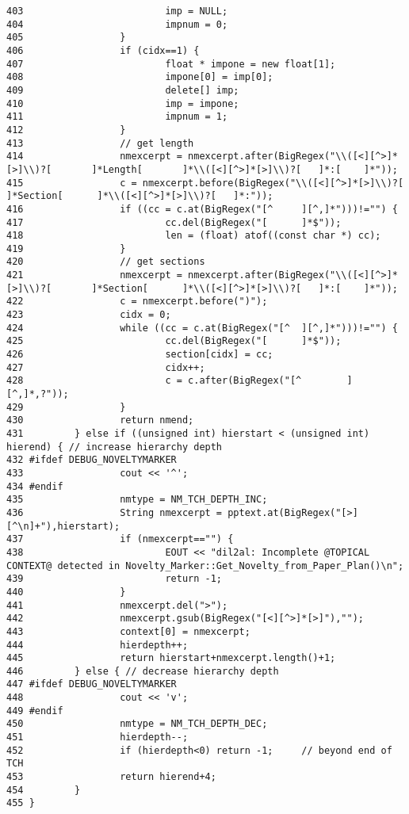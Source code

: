 \begin{verbatim}
403                         imp = NULL;
404                         impnum = 0;
405                 }
406                 if (cidx==1) {
407                         float * impone = new float[1];
408                         impone[0] = imp[0];
409                         delete[] imp;
410                         imp = impone;
411                         impnum = 1;
412                 }
413                 // get length
414                 nmexcerpt = nmexcerpt.after(BigRegex("\\([<][^>]*[>]\\)?[       ]*Length[       ]*\\([<][^>]*[>]\\)?[   ]*:[    ]*"));
415                 c = nmexcerpt.before(BigRegex("\\([<][^>]*[>]\\)?[      ]*Section[      ]*\\([<][^>]*[>]\\)?[   ]*:"));
416                 if ((cc = c.at(BigRegex("[^     ][^,]*")))!="") {
417                         cc.del(BigRegex("[      ]*$"));
418                         len = (float) atof((const char *) cc);
419                 }
420                 // get sections
421                 nmexcerpt = nmexcerpt.after(BigRegex("\\([<][^>]*[>]\\)?[       ]*Section[      ]*\\([<][^>]*[>]\\)?[   ]*:[    ]*"));
422                 c = nmexcerpt.before(")");
423                 cidx = 0;
424                 while ((cc = c.at(BigRegex("[^  ][^,]*")))!="") {
425                         cc.del(BigRegex("[      ]*$"));
426                         section[cidx] = cc;
427                         cidx++;
428                         c = c.after(BigRegex("[^        ][^,]*,?"));
429                 }
430                 return nmend;
431         } else if ((unsigned int) hierstart < (unsigned int) hierend) { // increase hierarchy depth
432 #ifdef DEBUG_NOVELTYMARKER
433                 cout << '^';
434 #endif
435                 nmtype = NM_TCH_DEPTH_INC;
436                 String nmexcerpt = pptext.at(BigRegex("[>][^\n]+"),hierstart);
437                 if (nmexcerpt=="") {
438                         EOUT << "dil2al: Incomplete @TOPICAL CONTEXT@ detected in Novelty_Marker::Get_Novelty_from_Paper_Plan()\n";
439                         return -1;
440                 }
441                 nmexcerpt.del(">");
442                 nmexcerpt.gsub(BigRegex("[<][^>]*[>]"),"");
443                 context[0] = nmexcerpt;
444                 hierdepth++;
445                 return hierstart+nmexcerpt.length()+1;
446         } else { // decrease hierarchy depth
447 #ifdef DEBUG_NOVELTYMARKER
448                 cout << 'v';
449 #endif
450                 nmtype = NM_TCH_DEPTH_DEC;
451                 hierdepth--;
452                 if (hierdepth<0) return -1;     // beyond end of TCH
453                 return hierend+4;
454         }
455 }
\end{verbatim}\normalsize 


